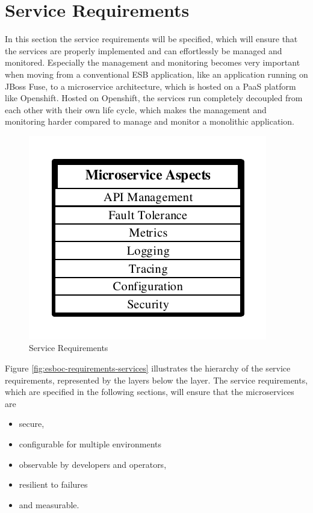 \section{Service Requirements}
\label{sec:esboc-requirements-service}
In this section the service requirements will be specified, which will ensure that the services are properly implemented and can effortlessly be managed and monitored. Especially the management and monitoring becomes very important when moving from a conventional ESB application, like an application running on JBoss Fuse, to a microservice architecture, which is hosted on a PaaS platform like Openshift. Hosted on Openshift, the services run completely decoupled from each other with their own life cycle, which makes the management and monitoring harder compared to manage and monitor a monolithic application.

\begin{figure}[htbp]
	\centering
	\includegraphics[scale=1]{images/esboc-requirement-services.pdf}
	\caption{Service Requirements}
	\label{fig:esboc-requirements-services}
\end{figure} 
Figure \vref{fig:esboc-requirements-services} illustrates the hierarchy of the service requirements, represented by the layers below the  layer. The service requirements, which are specified in the following sections, will ensure that the microservices are
\begin{itemize}
	\item secure,
	\item configurable for multiple environments
	\item observable by developers and operators,
	\item resilient to failures
	\item and measurable.
\end{itemize}

